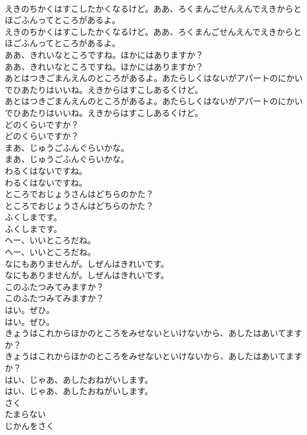 \documentclass[8pt]{extreport}
\begin{document}
\begin{CJK}{UTF8}{min}
\\	えきのちかくはすこしたかくなるけど。ああ、ろくまんごせんえんでえきからとほごふんってところがあるよ。	
\\	えきのちかくはすこしたかくなるけど。ああ、ろくまんごせんえんでえきからとほごふんってところがあるよ。 
\\	ああ、きれいなところですね。ほかにはありますか？	
\\	ああ、きれいなところですね。ほかにはありますか？ 
\\	あとはつきごまんえんのところがあるよ。あたらしくはないがアパートのにかいでひあたりはいいね。えきからはすこしあるくけど。	
\\	あとはつきごまんえんのところがあるよ。あたらしくはないがアパートのにかいでひあたりはいいね。えきからはすこしあるくけど。 
\\	どのくらいですか？	
\\	どのくらいですか？ 
\\	まあ、じゅうごふんぐらいかな。	
\\	まあ、じゅうごふんぐらいかな。 
\\	わるくはないですね。	
\\	わるくはないですね。 
\\	ところでおじょうさんはどちらのかた？	
\\	ところでおじょうさんはどちらのかた？ 
\\	ふくしまです。	
\\	ふくしまです。 
\\	へー、いいところだね。	
\\	へー、いいところだね。 
\\	なにもありませんが。しぜんはきれいです。	
\\	なにもありませんが。しぜんはきれいです。 
\\	このふたつみてみますか？	
\\	このふたつみてみますか？ 
\\	はい。ぜひ。	
\\	はい。ぜひ。 
\\	きょうはこれからほかのところをみせないといけないから、あしたはあいてますか？	
\\	きょうはこれからほかのところをみせないといけないから、あしたはあいてますか？ 
\\	はい、じゃあ、あしたおねがいします。	
\\	はい、じゃあ、あしたおねがいします。 
\\	さく
\\	たまらない
\\	じかんをさく

\end{CJK}
\end{document}
